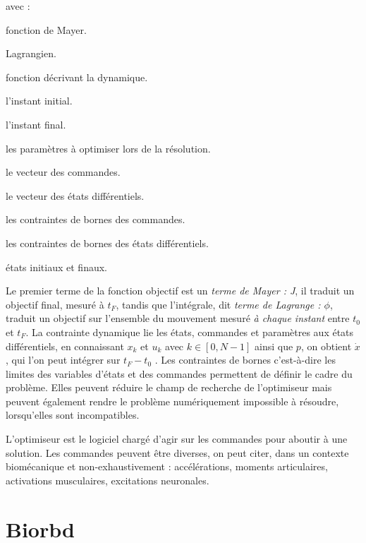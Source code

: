 avec :
\begin{description}
\setlength\itemsep{-0.5em}
\item[J :] fonction de Mayer.
\item[$\phi$ :] Lagrangien.
\item[f :] fonction décrivant la dynamique.
\item[t$_{\text{0}}$ :] l’instant initial.
\item[t$_{\text{F}}$ :] l’instant final.
\item[p :] les paramètres à optimiser lors de la résolution.
\item[u :] le vecteur des commandes.
\item[x :] le vecteur des états différentiels.
\item[u$_{\text{min}}$, u$_{\text{max}}$ :] les contraintes de bornes des commandes.
\item[x$_{\text{min}}$, x$_{\text{max}}$ :] les contraintes de bornes des états différentiels.
\item[x$_{\text{0}}$, x$_{\text{F}}$ :] états initiaux et finaux.
\end{description}


Le premier terme de la fonction objectif est un \emph{terme de Mayer : J}, il traduit un objectif final, mesuré à $t_{F}$, tandis que l’intégrale, dit \emph{terme de Lagrange : $\phi$}, traduit un objectif sur l’ensemble du mouvement mesuré \emph{à chaque instant} entre $t_{0}$ et $t_{F}$. %
La contrainte dynamique lie les états, commandes et paramètres aux états différentiels, en connaissant $x_{k}$ et $u_{k}$ avec $k \in [0, N-1]$ ainsi que $p$, on obtient $\dot{x}$, qui l'on peut intégrer sur $t_{F} - t_{0}$ . Les contraintes de bornes c’est-à-dire les limites des variables d’états et des commandes permettent de définir le cadre du problème. Elles peuvent réduire le champ de recherche de l’optimiseur mais peuvent également rendre le problème numériquement impossible à résoudre, lorsqu'elles sont incompatibles.

L'optimiseur est le logiciel chargé d'agir sur les commandes pour aboutir à une solution. Les commandes peuvent être diverses, on peut citer, dans un contexte biomécanique et non-exhaustivement : accélérations, moments articulaires, activations musculaires, excitations neuronales.
        
        \section{Biorbd}
        

